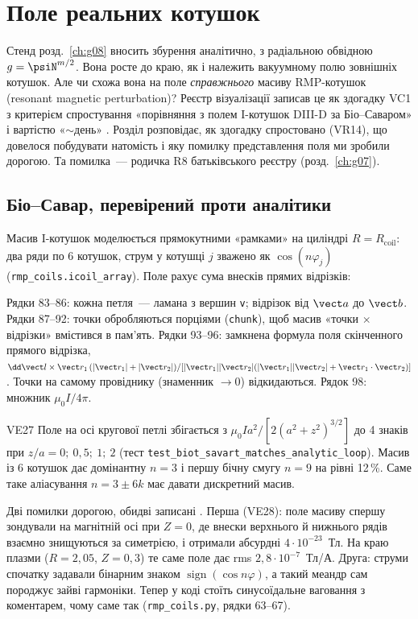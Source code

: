 \chapter{Поле реальних котушок}\label{ch:g09}

Стенд розд.~\ref{ch:g08} вносить збурення аналітично, з радіальною обвідною $g=\psiN^{m/2}$.
Вона росте до краю, як і належить вакуумному полю зовнішніх котушок. Але чи схожа вона на поле
\emph{справжнього} масиву RMP-котушок (resonant magnetic perturbation)? Реєстр візуалізації
записав це як здогадку VC1 з критерієм спростування «порівняння з полем I-котушок DIII-D за
Біо--Саваром» і вартістю «$\sim$день» \cite{RegViz}. Розділ розповідає, як здогадку спростовано
(VR14), що довелося побудувати натомість і яку помилку представлення поля ми зробили дорогою.
Та помилка~--- родичка R8 батьківського реєстру (розд.~\ref{ch:g07}).

\section{Біо--Савар, перевірений проти аналітики}\label{sec:g09-bs}

Масив I-котушок моделюється прямокутними «рамками» на циліндрі $R=R_{\text{coil}}$: два ряди по
6 котушок, струм у котушці $j$ зважено як $\cos(n\varphi_j)$ (\texttt{rmp\_coils.icoil\_array}).
Поле рахує сума внесків прямих відрізків:


Рядки 83--86: кожна петля~--- ламана з вершин \texttt{v}; відрізок від $\vect a$ до $\vect b$.
Рядки 87--92: точки обробляються порціями (\texttt{chunk}), щоб масив «точки $\times$ відрізки»
вмістився в пам'ять. Рядки 93--96: замкнена формула поля скінченного прямого відрізка,
$\dd\vect l\times\vect r_1\,(|\vect r_1|+|\vect r_2|)/[|\vect r_1||\vect r_2|(|\vect r_1||\vect r_2|+\vect r_1\cdot\vect r_2)]$.
Точки на самому провіднику (знаменник $\to0$) відкидаються. Рядок 98: множник $\mu_0I/4\pi$.

\begin{established}{VE27}
Поле на осі кругової петлі збігається з $\mu_0Ia^2/[2(a^2+z^2)^{3/2}]$ до 4 знаків при
$z/a=0;\ 0{,}5;\ 1;\ 2$ (тест \nolinkurl{test_biot_savart_matches_analytic_loop}). Масив із 6
котушок дає домінантну $n=3$ і першу бічну смугу $n=9$ на рівні 12\,\%. Саме таке аліасування
$n=3\pm6k$ має давати дискретний масив.
\end{established}

Дві помилки дорогою, обидві записані \cite{g07Campaign}. Перша (VE28): поле масиву спершу
зондували на магнітній осі при $Z=0$, де внески верхнього й нижнього рядів взаємно знищуються за
симетрією, і отримали абсурдні $4\cdot10^{-23}$~Тл. На краю плазми ($R=2{,}05$, $Z=0{,}3$) те саме
поле дає rms $2{,}8\cdot10^{-7}$~Тл/А. Друга: струми спочатку задавали бінарним знаком
$\operatorname{sign}(\cos n\varphi)$, а такий меандр сам породжує зайві гармоніки. Тепер у коді
стоїть синусоїдальне ваговання з коментарем, чому саме так (\texttt{rmp\_coils.py}, рядки 63--67).

